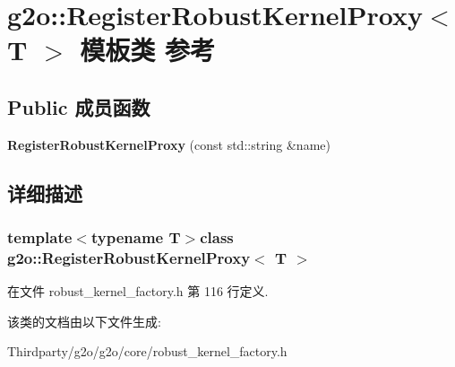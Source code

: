 \hypertarget{classg2o_1_1RegisterRobustKernelProxy}{\section{g2o\-:\-:Register\-Robust\-Kernel\-Proxy$<$ T $>$ 模板类 参考}
\label{classg2o_1_1RegisterRobustKernelProxy}
}
\subsection*{Public 成员函数}
\begin{DoxyCompactItemize}
\item 
\hypertarget{classg2o_1_1RegisterRobustKernelProxy_a9eb5309c892d96d5cc5b3d7a15670818}{{\bfseries Register\-Robust\-Kernel\-Proxy} (const std\-::string \&name)}\label{classg2o_1_1RegisterRobustKernelProxy_a9eb5309c892d96d5cc5b3d7a15670818}

\end{DoxyCompactItemize}


\subsection{详细描述}
\subsubsection*{template$<$typename T$>$class g2o\-::\-Register\-Robust\-Kernel\-Proxy$<$ T $>$}



在文件 robust\-\_\-kernel\-\_\-factory.\-h 第 116 行定义.



该类的文档由以下文件生成\-:\begin{DoxyCompactItemize}
\item 
Thirdparty/g2o/g2o/core/robust\-\_\-kernel\-\_\-factory.\-h\end{DoxyCompactItemize}
